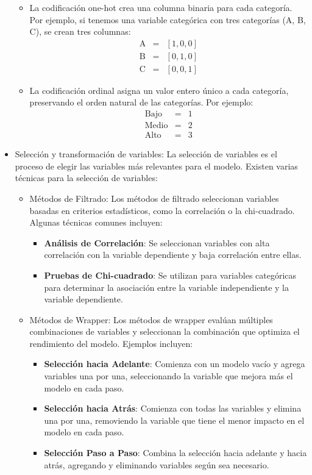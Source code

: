 \documentclass[a4paper]{report} %
\begin{document}
\begin{itemize}
\begin{itemize}
\item La codificaci\'on one-hot crea una columna binaria para cada categor\'ia. Por ejemplo, si tenemos una variable categ\'orica con tres categor\'ias (A, B, C), se crean tres columnas:
\begin{eqnarray*}
\text{A} &=& [1, 0, 0] \\
\text{B} &=& [0, 1, 0] \\
\text{C} &=& [0, 0, 1]
\end{eqnarray*}

\item La codificaci\'on ordinal asigna un valor entero \'unico a cada categor\'ia, preservando el orden natural de las categor\'ias. Por ejemplo:
\begin{eqnarray*}
\text{Bajo} &=& 1 \\
\text{Medio} &=& 2 \\
\text{Alto} &=& 3
\end{eqnarray*}
\end{itemize}
    \item Selecci\'on y transformaci\'on de variables: La selecci\'on de variables es el proceso de elegir las variables m\'as relevantes para el modelo. Existen varias t\'ecnicas para la selecci\'on de variables:

\begin{itemize}
\item M\'etodos de Filtrado: Los m\'etodos de filtrado seleccionan variables basadas en criterios estad\'isticos, como la correlaci\'on o la chi-cuadrado. Algunas t\'ecnicas comunes incluyen:
\begin{itemize}
    \item \textbf{An\'alisis de Correlaci\'on}: Se seleccionan variables con alta correlaci\'on con la variable dependiente y baja correlaci\'on entre ellas.
    \item \textbf{Pruebas de Chi-cuadrado}: Se utilizan para variables categ\'oricas para determinar la asociaci\'on entre la variable independiente y la variable dependiente.
\end{itemize}

\item M\'etodos de Wrapper: Los m\'etodos de wrapper eval\'uan m\'ultiples combinaciones de variables y seleccionan la combinaci\'on que optimiza el rendimiento del modelo. Ejemplos incluyen:
\begin{itemize}
    \item \textbf{Selecci\'on hacia Adelante}: Comienza con un modelo vac\'io y agrega variables una por una, seleccionando la variable que mejora m\'as el modelo en cada paso.
    \item \textbf{Selecci\'on hacia Atr\'as}: Comienza con todas las variables y elimina una por una, removiendo la variable que tiene el menor impacto en el modelo en cada paso.
    \item \textbf{Selecci\'on Paso a Paso}: Combina la selecci\'on hacia adelante y hacia atr\'as, agregando y eliminando variables seg\'un sea necesario.
\end{itemize}


\end{itemize}
\end{itemize}
\end{document}
